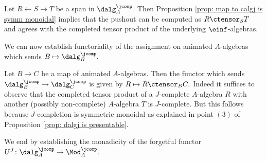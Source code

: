 \documentclass[10pt,reqno]{amsart}
\numberwithin{equation}{section}
\begin{document}
\begin{remark}
    Let $R\leftarrow S\rightarrow T$ be a span in $\dalg_A^\jcomp$. Then Proposition \ref{prop: map to calgj is symm monoidal} implies that the pushout can be computed as $R\ctensor_S T$ and agrees with the completed tensor product of the underlying $\einf$-algebras. 
\end{remark}

We can now establish functoriality of the assignment on animated $A$-algebras which sends $B\mapsto \dalg_B^\jcomp.$

\begin{remark}\label{remark: functoriality of dalgj}
     Let $B\to C$ be a map of animated $A$-algebras. Then the functor which sends $\dalg_B^\jcomp\to \dalg_C^\jcomp$ is given by $R\mapsto R\ctensor_B C.$ Indeed it suffices to observe that the completed tensor product of a $J$-complete $A$-algebra $R$ with another (possibly non-complete) $A$-algebra $T$ is $J$-complete. But this follows because $J$-completion is symmetric monoidal as explained in point $(3)$ of Proposition \ref{prop: dalgj is presentable}.
\end{remark}

We end by establishing the monadicity of the forgetful functor $U^J\colon \dalg_A^\jcomp \to \Mod_A^\jcomp.$ 
\end{document}
